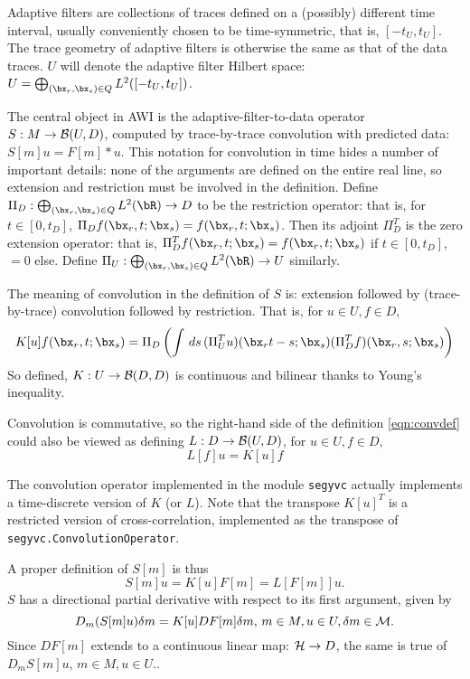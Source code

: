 Adaptive filters are collections of traces defined on a (possibly)
different time interval, usually conveniently chosen to be
time-symmetric, that is, $[-t_U,t_U]$. The trace geometry of adaptive
filters is otherwise the same as that of the data traces. $U$ will denote the  adaptive
filter Hilbert space: $U= \bigoplus_{(\bx_r,\bx_s) \in Q} L^2([-t_U,t_U])$.

The central object in AWI is the adaptive-filter-to-data operator $S:
M \rightarrow {\cal B}(U,D)$, computed by trace-by-trace convolution
with predicted data: $S[m]u = F[m] * u$.
This notation for convolution in time hides a number of important details: none of the arguments are defined on the entire real line, so extension and restriction must be involved in the definition. Define $\Pi_D: \bigoplus_{(\bx_r,\bx_s) \in Q} L^2(\bR) \rightarrow D$ to be the restriction operator: that is, for $t \in [0,t_D]$, $\Pi_Df(\bx_r,t;\bx_s) = f(\bx_r,t;\bx_s)$. Then its adjoint $\Pi_D^T$ is the zero extension operator: that is, $\Pi_D^Tf(\bx_r,t;\bx_s) = f(\bx_r,t;\bx_s)$ if $t \in [0,t_D]$, $= 0$ else. Define $\Pi_U:  \bigoplus_{(\bx_r,\bx_s) \in Q} L^2(\bR) \rightarrow U$ similarly.

The meaning of convolution in the definition of $S$ is: extension followed by (trace-by-trace) convolution followed by restriction. That is, for $u \in U, f \in D$,
\begin{equation}
  \label{eqn:convdef}
  K[u]f(\bx_r,t;\bx_s) = \Pi_D\left(\int\,ds\,(\Pi_U^Tu)(\bx_rt-s;\bx_s) (\Pi_D^Tf)(\bx_r,s;\bx_s)\right)
\end{equation}
So defined, $K:U \rightarrow {\cal B}(D,D)$ is continuous and bilinear thanks to Young's inequality.

Convolution is commutative, so the right-hand side of the definition \ref{eqn:convdef} could also be viewed as defining $L: D \rightarrow {\cal B}(U,D)$, for $u \in U, f \in D$,
\begin{equation}
  \label{eqn:altconvdef}
  L[f]u = K[u]f
\end{equation}

The convolution operator implemented in the module {\tt segyvc} actually implements a time-discrete version of $K$ (or $L$). Note that the transpose $K[u]^T$ is a restricted version of cross-correlation, implemented as the transpose of {\tt segyvc.ConvolutionOperator}.

A proper definition of $S[m]$ is thus
\begin{equation}
  \label{eqn:sdef}
  S[m]u = K[u]F[m] = L[F[m]]u.
\end{equation}
$S$ has a directional partial derivative with respect to its first argument, given by
\begin{equation}
  \label{eqn:dsdef}
  D_m(S[m]u) \delta m = K[u]DF[m] \delta m,\,m\in M, u \in U, \delta m \in {\cal M}.
\end{equation}
Since $DF[m]$ extends to a continuous linear map: ${\cal H} \rightarrow D$, the same is true of $D_mS[m]u$, $m \in M, u \in U$..


